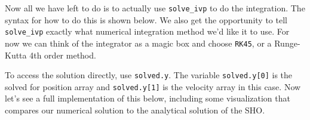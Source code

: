Now all we have left to do is to actually use \texttt{solve\_ivp} to do
the integration. The syntax for how to do this is shown below. We also
get the opportunity to tell \texttt{solve\_ivp} exactly what numerical
integration method we'd like it to use. For now we can think of the
integrator as a magic box and choose \texttt{RK45}, or a Runge-Kutta 4th
order method.

\begin{Shaded}
\begin{Highlighting}[]
\OperatorTok{=}\OperatorTok{=}\OperatorTok{=}\OperatorTok{=}\NormalTok{)}
\end{Highlighting}
\end{Shaded}

To access the solution directly, use \texttt{solved.y}. The variable
\texttt{solved.y{[}0{]}} is the solved for position array and
\texttt{solved.y{[}1{]}} is the velocity array in this case. Now let's
see a full implementation of this below, including some visualization
that compares our numerical solution to the analytical solution of the
SHO.

